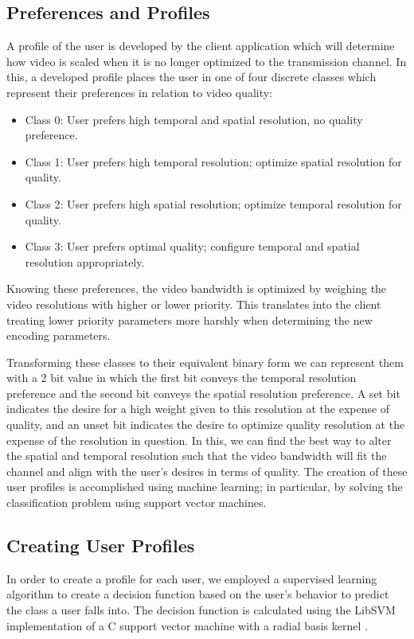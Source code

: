 \documentclass[3p,times,procedia]{elsarticle}
\begin{document}
\subsection{Preferences and Profiles}
A profile of the user is developed by the client application which will determine how video is scaled when it is no longer optimized to the transmission channel. In this, a developed profile places the user in one of four discrete classes which represent their preferences in relation to video quality:
\begin{itemize}
\item Class 0: User prefers high temporal and spatial resolution, no quality preference.
\item Class 1: User prefers high temporal resolution; optimize spatial resolution for quality.
\item Class 2: User prefers high spatial resolution; optimize temporal resolution for quality.
\item Class 3: User prefers optimal quality; configure temporal and spatial resolution appropriately.
\end{itemize}
Knowing these preferences, the video bandwidth is optimized by weighing the video resolutions with higher or lower priority. This translates into the client treating lower priority parameters more harshly when determining the new encoding parameters.

Transforming these classes to their equivalent binary form we can represent them with a 2 bit value in which the first bit conveys the temporal resolution preference and the second bit conveys the spatial resolution preference. A set bit indicates the desire for a high weight given to this resolution at the expense of quality, and an unset bit indicates the desire to optimize quality resolution at the expense of the resolution in question. In this, we can find the best way to alter the spatial and temporal resolution such that the video bandwidth will fit the channel and align with the user's desires in terms of quality. The creation of these user profiles is accomplished using machine learning; in particular, by solving the classification problem using support vector machines.

\subsection{Creating User Profiles}
In order to create a profile for each user, we employed a supervised learning algorithm to create a decision function based on the user’s behavior to predict the class a user falls into. The decision function is calculated using the LibSVM implementation of a C support vector machine with a radial basis kernel \cite{LibSVM}.
\end{document}
